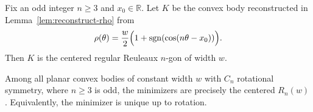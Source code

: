 \documentclass[10pt,a4paper]{amsart}
\newcommand{\R}{\mathbb{R}}
\begin{document}
\begin{lemma}
\label{lem:bang-bang-geometry}
Fix an odd integer $n\ge3$ and $x_0\in\R$. Let $K$ be the convex body reconstructed in Lemma~\ref{lem:reconstruct-rho} from
\[
\rho(\theta)=\frac w2\Bigl(1+\operatorname{sgn}(\cos(n\theta-x_0))\Bigr).
\]
Then $K$ is the centered regular Reuleaux $n$-gon of width $w$.
\end{lemma}

\begin{theorem}
\label{thm:cyclic-odd}
Among all planar convex bodies of constant width $w$ with $C_n$ rotational symmetry, where $n\ge3$ is odd, the minimizers are precisely the centered $R_n(w)$. Equivalently, the minimizer is unique up to rotation.
\end{theorem}
\end{document}
